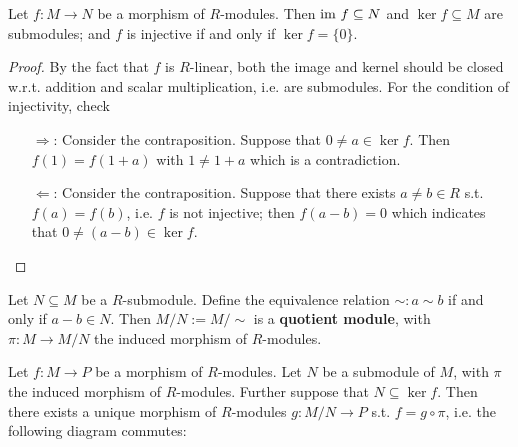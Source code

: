 \begin{proposition}\label{prop:R-module morphism injective iff kernel is 0}
    Let $f: M\to N$ be a morphism of $R$-modules. Then $\mathrm{im}\  f\subseteq N$ and $\ker f \subseteq M$ are submodules; and $f$ is injective if and only if $\ker f = \{0\}$. 
\end{proposition}

\begin{proof}
    By the fact that $f$ is $R$-linear, both the image and kernel should be closed w.r.t. addition and scalar multiplication, i.e. are submodules. For the condition of injectivity, check
    \begin{itemize}
        \item[$\Rightarrow$:] Consider the contraposition. Suppose that $0 \neq a\in\ker f$. Then $f(1) = f(1 + a)$ with $1 \neq 1+a$ which is a contradiction.
        \item[$\Leftarrow$:] Consider the contraposition. Suppose that there exists $a \neq b \in R$ s.t. $f(a) = f(b)$, i.e. $f$ is not injective; then $f(a-b) = 0$ which indicates that $0 \neq (a - b)\in \ker f$. 
    \end{itemize}
\end{proof}

\begin{definition}
    Let $N\subseteq M$ be a $R$-submodule. Define the equivalence relation $\sim: a\sim b$ if and only if $a - b \in N$. Then $M/N := M/\sim$ is a \textbf{quotient module}, with $\pi: M \to M/N$ the induced morphism of $R$-modules. 
\end{definition}

\begin{theorem}
    \label{thm:Universal Property of Quotient Modules}
    Let $f: M\to P$ be a morphism of $R$-modules. Let $N$ be a submodule of $M$, with $\pi$ the induced morphism of $R$-modules. Further suppose that $N \subseteq \ker f$. Then there exists a unique morphism of $R$-modules $g: M/N \to P$ s.t. $f = g\circ \pi$, i.e. the following diagram commutes:
    
    \begin{minipage}{\linewidth}
        \centering
    \end{minipage}
\end{theorem}

